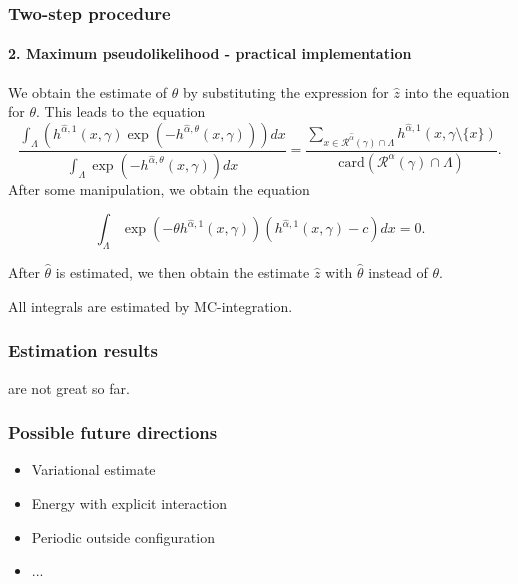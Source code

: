 \documentclass[c, 10pt]{beamer}
\begin{document}
\begin{frame}\frametitle{Two-step procedure}\framesubtitle{2. Maximum pseudolikelihood - practical implementation}
\begin{small}
We obtain the estimate of $\theta$ by substituting the expression for $\hat z$ into the equation for $\theta$. 
This leads to the equation
$$ 
\frac{\int_{\Lambda } (h^{\hat\alpha,1}(x,\gamma)\exp{\left(-h^{\hat\alpha,\theta}(x,\gamma)\right)}) dx} {  \int_{\Lambda } \exp{\left( -h^{\hat\alpha,\theta}(x,\gamma)\right)} dx} 
= \frac {\sum_{x \in \mathcal R^{\hat\alpha}(\gamma)\cap \Lambda } h^{\hat\alpha,1}(x,\gamma\setminus\{x\})} { \mbox{card}(\mathcal R^\alpha(\gamma)\cap \Lambda ) }. 
$$
After some manipulation, we obtain the equation

$$\int_{\Lambda} \exp{\left(-\theta h^{\hat\alpha, 1}(x,\gamma)\right)} (h^{\hat\alpha, 1}(x,\gamma) - c) dx = 0 .$$

After $\hat\theta$ is estimated, we then obtain the estimate $\hat z$ with $\hat\theta$ instead of $\theta$.

All integrals are estimated by MC-integration.
\end{small}
\end{frame}


\begin{frame}\frametitle{Estimation results}
are not great so far. 

\end{frame}





\begin{frame}\frametitle{Possible future directions}
\begin{itemize}
\item Variational estimate
\item Energy with explicit interaction
\item Periodic outside configuration
\item ...
\end{itemize}
\end{frame}



\end{document}
